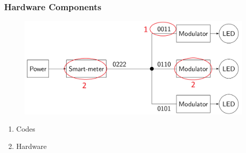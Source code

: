 \documentclass{beamer}
\begin{document}





	\begin{frame}\frametitle{Hardware Components}


		\begin{figure}
			\centering
			\includegraphics[width=\textwidth]{contributions-figure.png}
		\end{figure}
		\begin{enumerate}
				\item Codes
				\item Hardware
		\end{enumerate}
	\end{frame}





\end{document}
